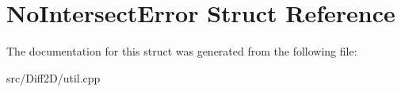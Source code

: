 \hypertarget{structNoIntersectError}{\section{No\-Intersect\-Error Struct Reference}
\label{structNoIntersectError}
}


The documentation for this struct was generated from the following file\-:\begin{DoxyCompactItemize}
\item 
src/\-Diff2\-D/util.\-cpp\end{DoxyCompactItemize}
